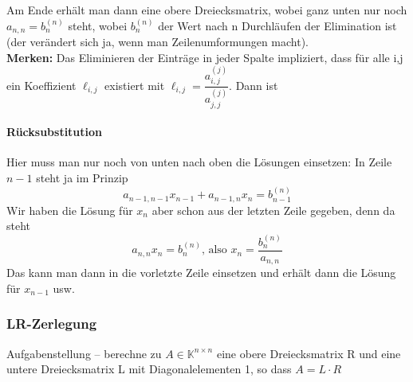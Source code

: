			Am Ende erhält man dann eine obere Dreiecksmatrix, wobei ganz unten nur noch $ a_{n,n} = b_n^{(n)} $ steht, wobei $ b_n^{(n)} $ der Wert nach n Durchläufen der Elimination ist (der verändert sich ja, wenn man Zeilenumformungen macht).\\
			\textbf{Merken:} Das Eliminieren der Einträge in jeder Spalte impliziert, dass für alle i,j ein Koeffizient $ \ell_{i,j} $ existiert mit $ \ell_{i,j} = \dfrac{a_{i,j}^{(j)}}{a_{j,j}^{(j)}}  $. Dann ist $  $
			
			\paragraph{Rücksubstitution} Hier muss man nur noch von unten nach oben die Lösungen einsetzen: 
			In Zeile $ n-1 $ steht ja im Prinzip
			$$ a_{n-1,n-1}x_{n-1} + a_{n-1,n}x_n = b_{n-1}^{(n)} $$
			Wir haben die Lösung für $ x_n $ aber schon aus der letzten Zeile gegeben, denn da steht
			$$ a_{n,n}x_n = b_n^{(n)} \text{, also }  x_n = \frac{b_n^{(n)}}{a_{n,n}} $$
			Das kann man dann in die vorletzte Zeile einsetzen und erhält dann die Lösung für $ x_{n-1} $ usw.
			
			
		\subsubsection{LR-Zerlegung}
			Aufgabenstellung -- berechne zu $ A \in \mathbb{K}^{n \times n} $ eine obere Dreiecksmatrix R und eine untere Dreiecksmatrix L mit Diagonalelementen 1, so	dass $ A = L \cdot R $
			
			
			
			
			
			
			
			
			
			